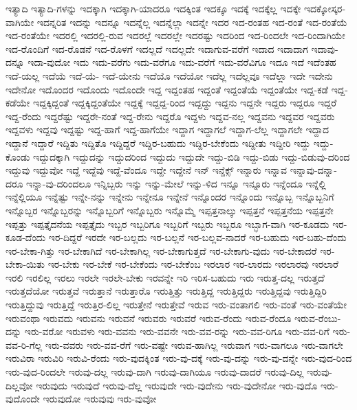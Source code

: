 {ಇತ್ಯಾದಿ
ಇತ್ಯಾದಿ-ಗಳನ್ನು
ಇದಕ್ಕಾಗಿ
ಇದಕ್ಕಾಗಿ-ಯಾದರೂ
ಇದಕ್ಕಿಂತ
ಇದಕ್ಕೂ
ಇದಕ್ಕೆ
ಇದಕ್ಕೆಲ್ಲ
ಇದಕ್ಕೇ
ಇದಕ್ಕೋಸ್ಕರ-ವಾಗಿಯೇ
ಇದನ್ನರಿತ
ಇದನ್ನು
ಇದನ್ನೂ
ಇದನ್ನೆಲ್ಲ
ಇದನ್ನೆಲ್ಲಾ
ಇದನ್ನೇ
ಇದರ
ಇದ-ರಂತಹ
ಇದ-ರಂತೆ
ಇದ-ರಂತೆಯೆ
ಇದ-ರಂತೆಯೇ
ಇದರಲ್ಲಿ
ಇದರಲ್ಲಿ-ರುವ
ಇದರಲ್ಲೆ
ಇದರಲ್ಲೇ
ಇದರಷ್ಟು
ಇದರಿಂದ
ಇದ-ರಿಂದಲೇ
ಇದ-ರಿಂದಾಗಿಯೇ
ಇದ-ರೊಂದಿಗೆ
ಇದ-ರೊಡನೆ
ಇದ-ರೊಳಗೆ
ಇದಲ್ಲದೆ
ಇದಲ್ಲದೇ
ಇದಾಗುವ-ವರೆಗೆ
ಇದಾದ
ಇದಾದಾಗ
ಇದಾವು-ದನ್ನೂ
ಇದಾ-ವುದೋ
ಇದು
ಇದು-ವರೆಗು
ಇದು-ವರೆಗೂ
ಇದು-ವರೆಗೆ
ಇದು-ವರೆವಿಗೂ
ಇದೂ
ಇದೆ
ಇದೆಂತಹ
ಇದೆ-ಯಲ್ಲ
ಇದೆಯೆ
ಇದೆ-ಯೆ-
ಇದೆ-ಯೇನು
ಇದೆಯೊ
ಇದೆಯೋ
ಇದೆಲ್ಲ
ಇದೆಲ್ಲವೂ
ಇದೆಲ್ಲಾ
ಇದೇ
ಇದೇನು
ಇದೇನೋ
ಇದೊಂದರ
ಇದೊಂದು
ಇದೊಂದೇ
ಇದ್ದ
ಇದ್ದಂತಹ
ಇದ್ದಂತೆ
ಇದ್ದಂತೆಯೆ
ಇದ್ದಂತೆಯೇ
ಇದ್ದ-ಕಡೆ
ಇದ್ದ-ಕಡೆಯೇ
ಇದ್ದಕ್ಕಿದ್ದಂತೆ
ಇದ್ದಕ್ಕಿದ್ದಂತೆಯೇ
ಇದ್ದಕ್ಕೆ
ಇದ್ದದ್ದ-ರಿಂದ
ಇದ್ದದ್ದು
ಇದ್ದನು
ಇದ್ದನೇ
ಇದ್ದರು
ಇದ್ದರೂ
ಇದ್ದರೆ
ಇದ್ದ-ರೆಂದು
ಇದ್ದರೆಷ್ಟು
ಇದ್ದರೇ-ನಂತೆ
ಇದ್ದ-ರೇನು
ಇದ್ದರೊ
ಇದ್ದಳು
ಇದ್ದವ-ನಲ್ಲ
ಇದ್ದವನು
ಇದ್ದವರ
ಇದ್ದವರು
ಇದ್ದವಳು
ಇದ್ದವು
ಇದ್ದಷ್ಟು
ಇದ್ದ-ಹಾಗೆ
ಇದ್ದ-ಹಾಗೆಯೇ
ಇದ್ದಾಗ
ಇದ್ದಾಗಲೆ
ಇದ್ದಾಗ-ಲೆಲ್ಲ
ಇದ್ದಾಗಲೇ
ಇದ್ದಾದ
ಇದ್ದಾನೆ
ಇದ್ದಾರೆ
ಇದ್ದಿತು
ಇದ್ದಿತೊ
ಇದ್ದಿದ್ದರೆ
ಇದ್ದಿರ-ಬಹುದು
ಇದ್ದಿರ-ಬೇಕೆಂದು
ಇದ್ದೀತು
ಇದ್ದೀರಿ
ಇದ್ದು
ಇದ್ದು-ಕೊಂಡು
ಇದ್ದುದಕ್ಕಾಗಿ
ಇದ್ದುದನ್ನು
ಇದ್ದುದರಿಂದ
ಇದ್ದುದು
ಇದ್ದುದೇ
ಇದ್ದು-ಬಿಡಿ
ಇದ್ದು-ಬಿಡು
ಇದ್ದು-ಬಿಡುವು-ದರಿಂದ
ಇದ್ದುವು
ಇದ್ದುವೋ
ಇದ್ದೆ
ಇದ್ದೆವು
ಇದ್ದೆ-ವೆಂದೂ
ಇದ್ದೇ
ಇದ್ದೇನೆ
ಇನ್
ಇನ್ಡೆಕ್ಸ್
ಇನ್ನಾರು
ಇನ್ನಾವ
ಇನ್ನಾವು-ದನ್ನಾ-ದರೂ
ಇನ್ನಾ-ವು-ದರಿಂದಲೂ
ಇನ್ನಿಬ್ಬರು
ಇನ್ನು
ಇನ್ನು-ಮೇಲೆ
ಇನ್ನು-ಳಿದ
ಇನ್ನೂ
ಇನ್ನೂರು
ಇನ್ನೆಂದೂ
ಇನ್ನೆಲ್ಲಿ
ಇನ್ನೆಲ್ಲಿಯೂ
ಇನ್ನೆಷ್ಟು
ಇನ್ನೇ-ನನ್ನು
ಇನ್ನೇನು
ಇನ್ನೇನೂ
ಇನ್ನೇನೆ
ಇನ್ನೊಂದರ
ಇನ್ನೊಂದು
ಇನ್ನೊಬ್ಬ
ಇನ್ನೊಬ್ಬನಿಗೆ
ಇನ್ನೊಬ್ಬರ
ಇನ್ನೊಬ್ಬರನ್ನು
ಇನ್ನೊಬ್ಬರಿಗೆ
ಇನ್ನೊಬ್ಬರು
ಇನ್ನೊಮ್ಮೆ
ಇಪ್ಪತ್ತನಾಲ್ಕು
ಇಪ್ಪತ್ತನೆ
ಇಪ್ಪತ್ತನೆಯ
ಇಪ್ಪತ್ತನೇ
ಇಪ್ಪತ್ತು
ಇಪ್ಪತ್ತೈದನೆಯ
ಇಪ್ಪತ್ತೈದು
ಇಬ್ಬರ
ಇಬ್ಬರಿಗೂ
ಇಬ್ಬರಿಗೆ
ಇಬ್ಬರು
ಇಬ್ಬರೂ
ಇಬ್ಭಾಗ-ವಾಗಿ
ಇರ-ಕೂಡದು
ಇರ-ಕೂಡ-ದೆಂದು
ಇರ-ದಿದ್ದರೆ
ಇರದೇ
ಇರ-ಬಲ್ಲದು
ಇರ-ಬಲ್ಲನೆ
ಇರ-ಬಲ್ಲವ-ನಾದರೆ
ಇರ-ಬಹುದು
ಇರ-ಬಹು-ದೆಂದು
ಇರ-ಬೇಕಾ-ಗಿತ್ತು
ಇರ-ಬೇಕಾಗಿದೆ
ಇರ-ಬೇಕಾಗಿಲ್ಲ
ಇರ-ಬೇಕಾಗುತ್ತದೆ
ಇರ-ಬೇಕಾಗು-ವುದು
ಇರ-ಬೇಕಾದರೆ
ಇರ-ಬೇಕಾ-ಯಿತು
ಇರ-ಬೇಕು
ಇರ-ಬೇಕೆ
ಇರ-ಬೇಕೆಂದು
ಇರ-ಬೇಕೆಂಬ
ಇರಲಾರ
ಇರ-ಲಾರದು
ಇರಲಾರವು
ಇರಲಾರೆ
ಇರಲಿ
ಇರಲಿಲ್ಲ
ಇರಲು
ಇರಲೇ
ಇರಲೇ-ಬೇಕು
ಇರವನ್ನೇ
ಇರಿ
ಇರಿಸ-ಬಹುದು
ಇರು
ಇರುತ್ತ-ದಲ್ಲ
ಇರುತ್ತದೆ
ಇರುತ್ತದೆಯೋ
ಇರುತ್ತವೆ
ಇರುತ್ತಾನೆ
ಇರುತ್ತಾರೊ
ಇರುತ್ತಿತ್ತು
ಇರುತ್ತಿದ್ದ
ಇರುತ್ತಿದ್ದರು
ಇರುತ್ತಿದ್ದವು
ಇರುತ್ತಿದ್ದಿರಿ
ಇರುತ್ತಿದ್ದುವು
ಇರುತ್ತಿದ್ದೆ
ಇರುತ್ತಿರ-ಲಿಲ್ಲ
ಇರುತ್ತೇನೆ
ಇರುತ್ತೇವೆ
ಇರುವ
ಇರು-ವಂತಾಗಲಿ
ಇರು-ವಂತೆ
ಇರು-ವಂತೆಯೇ
ಇರುವಂಥಾ
ಇರುವದು
ಇರುವನು
ಇರುವನೆ
ಇರುವರು
ಇರುವರೆ
ಇರುವ-ರೆಂದು
ಇರುವ-ರೆಂದೂ
ಇರುವ-ರೆಂಬು-ದನ್ನು
ಇರು-ವರೋ
ಇರುವಳು
ಇರು-ವವನು
ಇರು-ವವನೇ
ಇರು-ವವ-ರನ್ನು
ಇರು-ವವ-ರಿಗೂ
ಇರು-ವವ-ರಿಗೆ
ಇರು-ವವ-ರಿ-ಗೆಲ್ಲ
ಇರು-ವವರು
ಇರು-ವವ-ರೆಗೆ
ಇರು-ವಷ್ಟೇ
ಇರುವ-ಹಾಗಿಲ್ಲ
ಇರುವಾಗ
ಇರು-ವಾಗಲೂ
ಇರು-ವಾಗಲೇ
ಇರುವಿರಾ
ಇರುವಿರಿ
ಇರುವಿ-ರೆಂದು
ಇರು-ವುದಕ್ಕಿಂತ
ಇರು-ವು-ದಕ್ಕೆ
ಇರು-ವು-ದನ್ನು
ಇರು-ವು-ದನ್ನೇ
ಇರು-ವುದ-ರಿಂದ
ಇರು-ವುದ-ರಿಂದಲೇ
ಇರುವು-ದಲ್ಲ
ಇರುವು-ದಾಗಿ
ಇರುವು-ದಾಗಿಯೂ
ಇರುವು-ದಾದರೆ
ಇರುವು-ದಿಲ್ಲ
ಇರುವು-ದಿಲ್ಲವೋ
ಇರುವುದು
ಇರುವುದೆ
ಇರುವು-ದೆಲ್ಲ
ಇರುವುದೇ
ಇರು-ವುದೇನು
ಇರು-ವುದೇನೋ
ಇರು-ವುದೊ
ಇರು-ವುದೊಂದೇ
ಇರುವುದೋ
ಇರುವುವು
ಇರು-ವುವೋ
}
